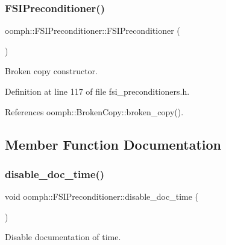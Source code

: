 \subsubsection{\texorpdfstring{F\+S\+I\+Preconditioner()}{FSIPreconditioner()}\hspace{0.1cm}{\footnotesize\ttfamily [2/2]}}
{\footnotesize\ttfamily oomph\+::\+F\+S\+I\+Preconditioner\+::\+F\+S\+I\+Preconditioner (\begin{DoxyParamCaption}\item[{const \hyperlink{classoomph_1_1FSIPreconditioner}{F\+S\+I\+Preconditioner} \&}]{ }\end{DoxyParamCaption})\hspace{0.3cm}{\ttfamily [inline]}}



Broken copy constructor. 



Definition at line 117 of file fsi\+\_\+preconditioners.\+h.



References oomph\+::\+Broken\+Copy\+::broken\+\_\+copy().



\subsection{Member Function Documentation}
\mbox{\label{classoomph_1_1FSIPreconditioner_a932cb1cf6a20503a5cbb43a6b67f2340}} 
\subsubsection{\texorpdfstring{disable\+\_\+doc\+\_\+time()}{disable\_doc\_time()}}
{\footnotesize\ttfamily void oomph\+::\+F\+S\+I\+Preconditioner\+::disable\+\_\+doc\+\_\+time (\begin{DoxyParamCaption}{ }\end{DoxyParamCaption})\hspace{0.3cm}{\ttfamily [inline]}}



Disable documentation of time. 



